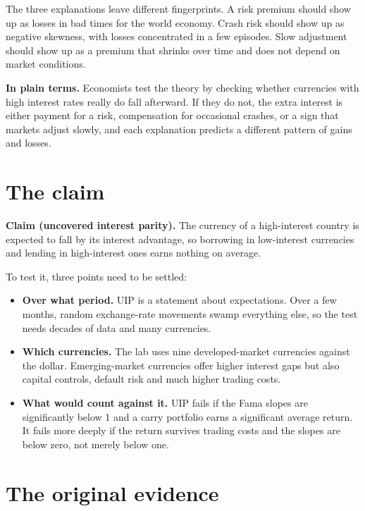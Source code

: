 The three explanations leave different fingerprints. A risk premium should show up as losses in bad times for the world economy. Crash risk should show up as negative skewness, with losses concentrated in a few episodes. Slow adjustment should show up as a premium that shrinks over time and does not depend on market conditions.

\noindent\textbf{In plain terms.} Economists test the theory by checking whether currencies with high interest rates really do fall afterward. If they do not, the extra interest is either payment for a risk, compensation for occasional crashes, or a sign that markets adjust slowly, and each explanation predicts a different pattern of gains and losses.


\section{The claim}
\label{sec:06-claim}

\begin{callout}
\textbf{Claim (uncovered interest parity).} The currency of a high-interest country is expected to fall by its interest advantage, so borrowing in low-interest currencies and lending in high-interest ones earns nothing on average.
\end{callout}

To test it, three points need to be settled:

\begin{itemize}
  \item \textbf{Over what period.} UIP is a statement about expectations. Over a few months, random exchange-rate movements swamp everything else, so the test needs decades of data and many currencies.
  \item \textbf{Which currencies.} The lab uses nine developed-market currencies against the dollar. Emerging-market currencies offer higher interest gaps but also capital controls, default risk and much higher trading costs.
  \item \textbf{What would count against it.} UIP fails if the Fama slopes are significantly below 1 and a carry portfolio earns a significant average return. It fails more deeply if the return survives trading costs and the slopes are below zero, not merely below one.
\end{itemize}

\section{The original evidence}
\label{sec:06-evidence}

